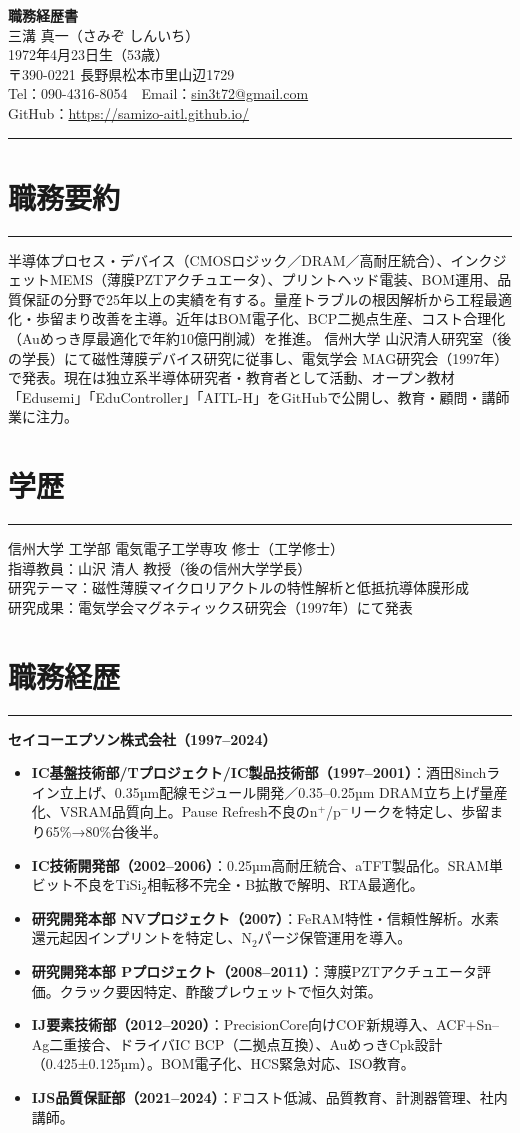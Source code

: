 \documentclass[lualatex,ja=standard,11pt]{bxjsarticle}
\newcommand{\cvsection}[1]{\section*{#1}\vspace{-0.3em}\hrule\vspace{0.5em}}
\begin{document}
\begin{center}
{\Huge \textbf{職務経歴書}} \\[1.2em]
{\Large 三溝 真一（さみぞ しんいち）} \\[0.5em]
1972年4月23日生（53歳） \\[0.3em]
〒390-0221 長野県松本市里山辺1729 \\[0.3em]
Tel：090-4316-8054　Email：\href{mailto:sin3t72@gmail.com}{sin3t72@gmail.com} \\[0.3em]
GitHub：\href{https://samizo-aitl.github.io/}{https://samizo-aitl.github.io/}
\end{center}

\vspace{1em}
\hrule
\vspace{1em}

\cvsection{職務要約}
半導体プロセス・デバイス（CMOSロジック／DRAM／高耐圧統合）、インクジェットMEMS（薄膜PZTアクチュエータ）、プリントヘッド電装、BOM運用、品質保証の分野で25年以上の実績を有する。量産トラブルの根因解析から工程最適化・歩留まり改善を主導。近年はBOM電子化、BCP二拠点生産、コスト合理化（Auめっき厚最適化で年約10億円削減）を推進。  
信州大学 山沢清人研究室（後の学長）にて磁性薄膜デバイス研究に従事し、電気学会 MAG研究会（1997年）で発表。現在は独立系半導体研究者・教育者として活動、オープン教材「Edusemi」「EduController」「AITL-H」をGitHubで公開し、教育・顧問・講師業に注力。

\cvsection{学歴}
信州大学 工学部 電気電子工学専攻 修士（工学修士）\\
指導教員：山沢 清人 教授（後の信州大学学長）\\
研究テーマ：磁性薄膜マイクロリアクトルの特性解析と低抵抗導体膜形成\\
研究成果：電気学会マグネティックス研究会（1997年）にて発表

\cvsection{職務経歴}
\textbf{セイコーエプソン株式会社（1997–2024）}

\begin{itemize}
  \item \textbf{IC基盤技術部/Tプロジェクト/IC製品技術部（1997–2001）}：酒田8inchライン立上げ、0.35µm配線モジュール開発／0.35–0.25µm DRAM立ち上げ量産化、VSRAM品質向上。Pause Refresh不良のn$^+$/p$^-$リークを特定し、歩留まり65\%→80\%台後半。
  \item \textbf{IC技術開発部（2002–2006）}：0.25µm高耐圧統合、aTFT製品化。SRAM単ビット不良をTiSi$_2$相転移不完全・B拡散で解明、RTA最適化。
  \item \textbf{研究開発本部 NVプロジェクト（2007）}：FeRAM特性・信頼性解析。水素還元起因インプリントを特定し、N$_2$パージ保管運用を導入。
  \item \textbf{研究開発本部 Pプロジェクト（2008–2011）}：薄膜PZTアクチュエータ評価。クラック要因特定、酢酸プレウェットで恒久対策。
  \item \textbf{IJ要素技術部（2012–2020）}：PrecisionCore向けCOF新規導入、ACF+Sn–Ag二重接合、ドライバIC BCP（二拠点互換）、AuめっきCpk設計（0.425±0.125µm）。BOM電子化、HCS緊急対応、ISO教育。
  \item \textbf{IJS品質保証部（2021–2024）}：Fコスト低減、品質教育、計測器管理、社内講師。
\end{itemize}
\end{document}
